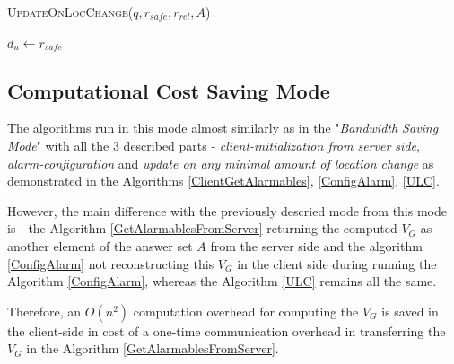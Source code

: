 \documentclass{sig-alternate}
\begin{document}
\begin{algorithm}
\caption{\textsc{UpdateOnLocChange}($q, r_{safe}, r_{rel}, A$)}
\label{ULC}

    
    
    
    \Return $d_u \gets r_{safe}$

\end{algorithm}

\subsection{Computational Cost Saving Mode}
The algorithms run in this mode almost similarly as in the "\textit{Bandwidth Saving Mode}" with all the 3 described parts - \textit{client-initialization from server side}, \textit{alarm-configuration} and \textit{update on any minimal amount of location change} as demonstrated in the Algorithms \ref{ClientGetAlarmables}, \ref{ConfigAlarm}, \ref{ULC}.

However, the main difference with the previously descried mode from this mode is - the Algorithm \ref{GetAlarmablesFromServer} returning the computed $V_G$ as another element of the answer set $A$ from the server side and the algorithm \ref{ConfigAlarm} not reconstructing this $V_G$ in the client side during running the Algorithm \ref{ConfigAlarm}, whereas the Algorithm \ref{ULC} remains all the same.

Therefore, an $O(n^2)$ computation overhead for computing the $V_G$ is saved in the client-side in cost of a one-time communication overhead in transferring the $V_G$ in the Algorithm \ref{GetAlarmablesFromServer}.\\
\end{document}
